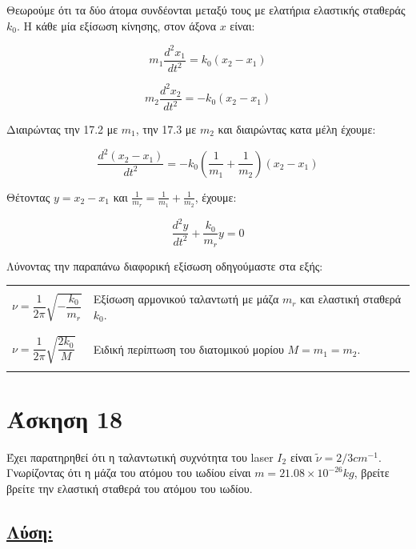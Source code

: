 \documentclass[a4paper,11pt,titlepage]{article}
\numberwithin{equation}{section} %
\begin{document}
Θεωρούμε ότι τα δύο άτομα συνδέονται μεταξύ τους με ελατήρια ελαστικής σταθεράς $k_0$. Η κάθε μία εξίσωση κίνησης, στον άξονα $x$ είναι:

\begin{equation}
 m_1\dfrac{d^2x_1}{dt^2}=k_0(x_2-x_1)
\end{equation}

\begin{equation}
 m_2\dfrac{d^2x_2}{dt^2}=-k_0(x_2-x_1)
\end{equation}

Διαιρώντας την 17.2 με $m_1$, την 17.3 με $m_2$ και διαιρώντας κατα μέλη έχουμε:

\begin{equation}
 \dfrac{d^2(x_2-x_1)}{dt^2}=-k_0(\dfrac{1}{m_1}+\dfrac{1}{m_2})(x_2-x_1)
\end{equation}

Θέτοντας $y=x_2-x_1$ και $\frac{1}{m_r}=\frac{1}{m_1}+\frac{1}{m_2}$, έχουμε:

\begin{equation}
 \dfrac{d^2y}{dt^2}+\dfrac{k_0}{m_r}y=0
\end{equation}

Λύνοντας την παραπάνω διαφορική εξίσωση οδηγούμαστε στα εξής:

\begin{tabular}{ l | l }
\hline
&\\
$ \nu=\dfrac{1}{2\pi}\sqrt{-\dfrac{k_0}{m_r}}$ & Εξίσωση αρμονικού ταλαντωτή με μάζα $m_r$ και ελαστική σταθερά $k_0$.\\  
&\\ 
\hline
&\\
$ \nu=\dfrac{1}{2\pi}\sqrt{\dfrac{2k_0}{M}}$   & Ειδική περίπτωση του διατομικού μορίου $M=m_1=m_2$.\\ 
&\\
\hline
\end{tabular}

\newpage
\section{Άσκηση 18}

Έχει παρατηρηθεί ότι η ταλαντωτική συχνότητα του laser $I_2$ είναι $\widetilde{\nu}=2/3cm^{-1}$. Γνωρίζοντας ότι η μάζα του ατόμου του ιωδίου είναι $m=21.08\times10^{-26}kg$, βρείτε βρείτε την ελαστική σταθερά του ατόμου του ιωδίου.

\subsection*{\underline{Λύση:}}
\end{document}
